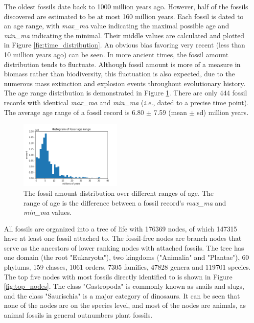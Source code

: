 \documentclass[11pt, a4paper,oneside,chapterprefix=false]{scrbook}
\begin{document}
\newpage
The oldest fossils date back to 1000 million years ago. However, half of the fossils discovered are estimated to be at most 160 million years. Each fossil is dated to an age range, with \emph{max\_ma} value indicating the maximal possible age and \emph{min\_ma} indicating the minimal. Their middle values are calculated and plotted in Figure \ref{fig:time_distribution}. An obvious bias favoring very recent (less than 10 million years ago) can be seen. In more ancient times, the fossil amount distribution tends to fluctuate. Although fossil amount is more of a measure in biomass rather than biodiversity, this fluctuation is also expected, due to the numerous mass extinction and explosion events throughout evolutionary history. The age range distribution is demonstrated in Figure \ref{fig:age_range}. There are only 444 fossil records with identical \emph{max\_ma} and \emph{min\_ma} (\emph{i.e.}, dated to a precise time point). The average age range of a fossil record is 6.80 $\pm$ 7.59 (mean $\pm$  sd) million years.

\begin{figure}[h]
	\centering
	\includegraphics[width=0.45\textwidth]{figures/result/age_range}
	\caption{The fossil amount distribution over different ranges of age. The range of age is the difference between a fossil record's \emph{max\_ma} and \emph{min\_ma} values. }
	\label{fig:age_range}
\end{figure}

All fossils are organized into a tree of life with 176369 nodes, of which 147315 have at least one fossil attached to. The fossil-free nodes are branch nodes that serve as the ancestors of lower ranking nodes with attached fossils. The tree has one domain (the root "Eukaryota"), two kingdoms ("Animalia" and "Plantae"), 60 phylums, 159 classes, 1061 orders, 7305 families, 47828 genera and 119701 species. The top five nodes with most fossils directly identified to is shown in Figure \ref{fig:top_nodes}. The class "Gastropoda" is commonly known as snails and slugs, and the class "Saurischia" is a major category of dinosaurs. It can be seen that none of the nodes are on the species level, and most of the nodes are animals, as animal fossils in general outnumbers plant fossils. \\
\end{document}
